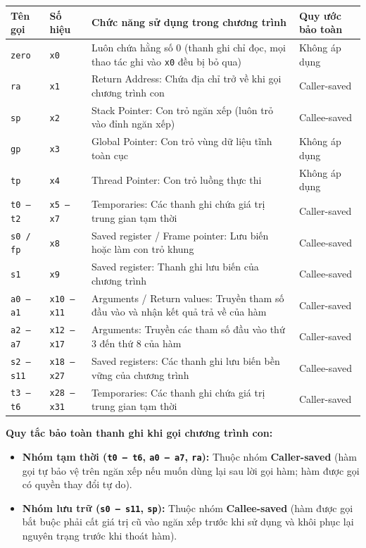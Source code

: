 \begin{tcolorbox}[bwbox, title={Bảng tra cứu 32 thanh ghi của RISC-V và Quy ước bảo toàn khi gọi hàm}]
\begin{center}
\renewcommand{\arraystretch}{1.2}
\small
\begin{tabularx}{\linewidth}{|L{2.0cm}|C{1.8cm}|Y|L{2.8cm}|}
\hline
\textbf{Tên gọi} & \textbf{Số hiệu} & \textbf{Chức năng sử dụng trong chương trình} & \textbf{Quy ước bảo toàn} \\ \hline
\texttt{zero} & \texttt{x0} & Luôn chứa hằng số $0$ (thanh ghi chỉ đọc, mọi thao tác ghi vào \texttt{x0} đều bị bỏ qua) & Không áp dụng \\ \hline
\texttt{ra} & \texttt{x1} & Return Address: Chứa địa chỉ trở về khi gọi chương trình con & Caller-saved \\ \hline
\texttt{sp} & \texttt{x2} & Stack Pointer: Con trỏ ngăn xếp (luôn trỏ vào đỉnh ngăn xếp) & Callee-saved \\ \hline
\texttt{gp} & \texttt{x3} & Global Pointer: Con trỏ vùng dữ liệu tĩnh toàn cục & Không áp dụng \\ \hline
\texttt{tp} & \texttt{x4} & Thread Pointer: Con trỏ luồng thực thi & Không áp dụng \\ \hline
\texttt{t0 -- t2} & \texttt{x5 -- x7} & Temporaries: Các thanh ghi chứa giá trị trung gian tạm thời & Caller-saved \\ \hline
\texttt{s0 / fp} & \texttt{x8} & Saved register / Frame pointer: Lưu biến hoặc làm con trỏ khung & Callee-saved \\ \hline
\texttt{s1} & \texttt{x9} & Saved register: Thanh ghi lưu biến của chương trình & Callee-saved \\ \hline
\texttt{a0 -- a1} & \texttt{x10 -- x11} & Arguments / Return values: Truyền tham số đầu vào và nhận kết quả trả về của hàm & Caller-saved \\ \hline
\texttt{a2 -- a7} & \texttt{x12 -- x17} & Arguments: Truyền các tham số đầu vào thứ 3 đến thứ 8 của hàm & Caller-saved \\ \hline
\texttt{s2 -- s11} & \texttt{x18 -- x27} & Saved registers: Các thanh ghi lưu biến bền vững của chương trình & Callee-saved \\ \hline
\texttt{t3 -- t6} & \texttt{x28 -- x31} & Temporaries: Các thanh ghi chứa giá trị trung gian tạm thời & Caller-saved \\ \hline
\end{tabularx}
\end{center}
\textbf{Quy tắc bảo toàn thanh ghi khi gọi chương trình con:}
\begin{itemize}
    \item \textbf{Nhóm tạm thời (\texttt{t0 -- t6}, \texttt{a0 -- a7}, \texttt{ra}):} Thuộc nhóm \textbf{Caller-saved} (hàm gọi tự bảo vệ trên ngăn xếp nếu muốn dùng lại sau lời gọi hàm; hàm được gọi có quyền thay đổi tự do).
    \item \textbf{Nhóm lưu trữ (\texttt{s0 -- s11}, \texttt{sp}):} Thuộc nhóm \textbf{Callee-saved} (hàm được gọi bắt buộc phải cất giá trị cũ vào ngăn xếp trước khi sử dụng và khôi phục lại nguyên trạng trước khi thoát hàm).
\end{itemize}
\end{tcolorbox}

